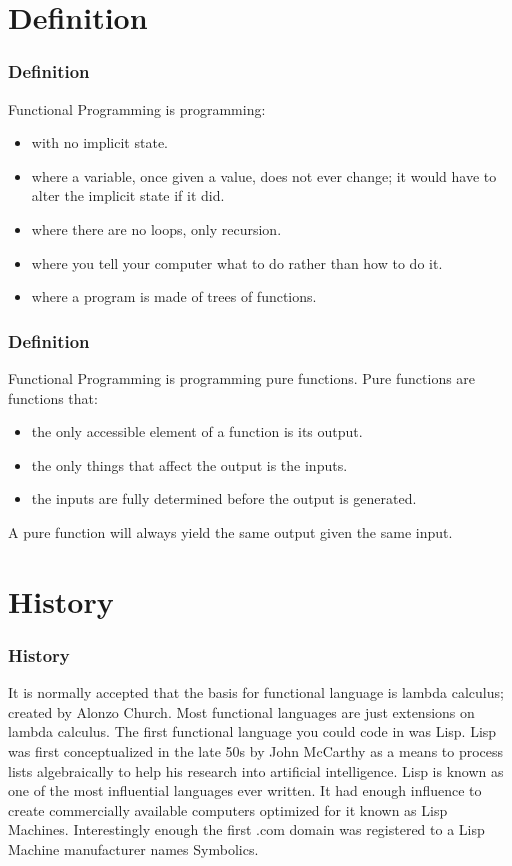 \documentclass[presentation.tex]{subfiles}
\begin{document}
\section{Definition}
\begin{frame}
  \frametitle{Definition}
  Functional Programming is programming:
  \begin{itemize}
    \item with no implicit state.
    \item where a variable, once given a value, does not ever change; it would have to alter the implicit state if it did.
    \item where there are no loops, only recursion.
    \item where you tell your computer what to do rather than how to do it.
    \item where a program is made of trees of functions.
  \end{itemize}
\end{frame}

\begin{frame}
  \frametitle{Definition}
  Functional Programming is programming pure functions.
  \vspace{\baselineskip}
  Pure functions are functions that:
  \begin{itemize}
    \item the only accessible element of a function is its output.
    \item the only things that affect the output is the inputs.
    \item the inputs are fully determined before the output is generated.
  \end{itemize}
  \vspace{\baselineskip}
  A pure function will always yield the same output given the same input.
\end{frame}


\section{History}
\begin{frame}
  \frametitle{History}
  It is normally accepted that the basis for functional language is lambda calculus; created by Alonzo Church. Most functional languages are just extensions on lambda calculus.
  \vspace{\baselineskip}
  The first functional language you could code in was Lisp. Lisp was first conceptualized in the late 50s by John McCarthy as a means to process lists algebraically to help his research into artificial intelligence.
  \vspace{\baselineskip}
  Lisp is known as one of the most influential languages ever written. It had enough influence to create commercially available computers optimized for it known as Lisp Machines. Interestingly enough the first .com domain was registered to a Lisp Machine manufacturer names Symbolics.
\end{frame}
\end{document}
